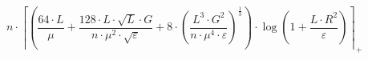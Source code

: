 \[n \cdot \left\lceil \left(\frac{64 \cdot L}{\mu} + \frac{128 \cdot L \cdot \sqrt{L} \cdot G}{n \cdot \mu^{2} \cdot \sqrt{\varepsilon}} + 8 \cdot \left(\frac{L^{3} \cdot G^{2}}{n \cdot \mu^{4} \cdot \varepsilon}\right)^{\frac{1}{3}}\right) \cdot \log\left(1 + \frac{L \cdot R^{2}}{\varepsilon}\right) \right\rceil_{+}\]
